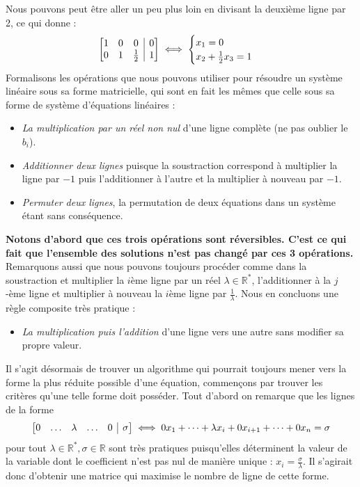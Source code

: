 \documentclass{article}
\newcommand{\R}{\mathbb{R}}
\begin{document}
Nous pouvons peut être aller un peu plus loin en divisant la deuxième ligne par 2, ce qui donne :
$$
\left[
\begin{array}{@{}ccc|c@{}}
1 & 0 & 0 & 0 \\
0 & 1 & \frac{1}{2} & 1 \\
\end{array}
\right]
\iff
\begin{cases}
x_1 = 0 \\
x_2 + \frac{1}{2}x_3 = 1
\end{cases}
$$
Formalisons les opérations que nous pouvons utiliser pour résoudre un système linéaire sous sa forme matricielle, qui sont en fait les mêmes que celle sous sa forme de système d'équations linéaires : 
\begin{itemize}
    \item \textit{La multiplication par un réel non nul} d'une ligne complète (ne pas oublier le $b_i$).
    \item \textit{Additionner deux lignes} puisque la soustraction correspond à multiplier la ligne par $-1$ puis l'additionner à l'autre et la multiplier à nouveau par $-1$.
    \item \textit{Permuter deux lignes}, la permutation de deux équations dans un système étant sans conséquence.
\end{itemize}
\textbf{Notons d'abord que ces trois opérations sont réversibles. C'est ce qui fait que l'ensemble des solutions n'est pas changé par ces 3 opérations.}\\

\noindent Remarquons aussi que nous pouvons toujours procéder comme dans la soustraction et multiplier la $i$ème ligne par un réel $\lambda \in \mathbb{R}^*$, l'additionner à la $j$-ème ligne et multiplier à nouveau la $i$ème ligne par $\frac{1}{\lambda}$. Nous en concluons une règle composite très pratique : 
\begin{itemize}
    \item \textit{La multiplication puis l'addition} d'une ligne vers une autre sans modifier sa propre valeur.
\end{itemize}
Il s'agit désormais de trouver un algorithme qui pourrait toujours mener vers la forme la plus réduite possible d'une équation, commençons par trouver les critères qu'une telle forme doit posséder. Tout d'abord on remarque que les lignes de la forme 
$$ 
\left[
\begin{array}{@{}ccccc|c@{}}
0 & \ldots & \lambda & \ldots & 0 & \sigma \\
\end{array}
\right]
\iff
0x_1 + \cdots + \lambda x_i + 0x_{i+1} + \cdots + 0x_n = \sigma
$$
pour tout $\lambda \in \R^*, \sigma \in \mathbb{R}$ sont très pratiques puisqu'elles déterminent la valeur de la variable dont le coefficient n'est pas nul de manière unique : $x_i = \frac{\sigma}{\lambda}$. Il s'agirait donc d'obtenir une matrice qui maximise le nombre de ligne de cette forme.\\
\end{document}
